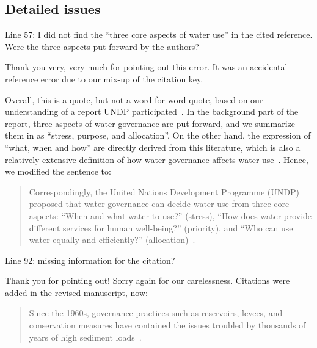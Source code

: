 \subsection{Detailed issues}

\RC{} Line 57: I did not find the ``three core aspects of water use'' in the cited reference. Were the three aspects put forward by the authors?

\AR Thank you very, very much for pointing out this error. It was an accidental reference error due to our mix-up of the citation key.

\AR*{} Overall, this is a quote, but not a word-for-word quote, based on our understanding of a report UNDP participated~\cite{mariajacobson2013}. In the background part of the report, three aspects of water governance are put forward, and we summarize them in as ``stress, purpose, and allocation''. On the other hand, the expression of ``what, when and how'' are directly derived from this literature, which is also a relatively extensive definition of how water governance affects water use~\cite{lasswell2018,allan2001,mariajacobson2013}. Hence, we modified the sentence to:

\begin{quote}
	Correspondingly, the United Nations Development Programme (UNDP) proposed that water governance can decide water use from three core aspects: ``When and what water to use?'' (stress), ``How does water provide different services for human well-being?'' (priority), and ``Who can use water equally and efficiently?'' (allocation)~\cite{mariajacobson2013}.
\end{quote}

\RC{} Line 92: missing information for the citation?

\AR{} Thank you for pointing out! Sorry again for our carelessness. Citations were added in the revised manuscript, now:

\begin{quote}
	Since the 1960s, governance practices such as reservoirs, levees, and conservation measures have contained the issues troubled by thousands of years of high sediment loads~\cite{wang2016a,song2020}.
\end{quote}

